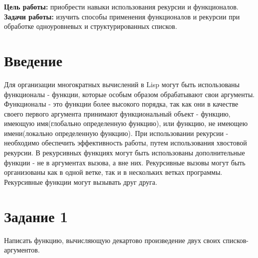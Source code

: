\documentclass[a4paper, 12pt]{article}
\begin{document}
\tableofcontents
\clearpage
\newpage

\textbf{Цель работы:} приобрести навыки использования рекурсии и функционалов.
\\ \hspace*{5mm} \textbf{Задачи работы:} изучить способы применения функционалов и рекурсии при обработке одноуровневых и структурированных списков.


\section*{Введение}

\hspace*{5mm} Для организации многократных вычислений в Lisp могут быть использованы функционалы - функции, которые особым образом обрабатывают свои аргументы. Функционалы - это  функции более высокого порядка, так как они в качестве своего первого аргумента принимают функциональный объект - функцию, имеющую имя(глобально определенную функцию), или функцию, не имеющею имени(локально определенную функцию). При использовании рекурсии - необходимо обеспечить эффективность работы, путем использования хвостовой рекурсии. В рекурсивных функциях могут быть использованы дополнительные функции - не в аргументах вызова, а вне них. Рекурсивные вызовы могут быть организованы как в одной ветке, так и в нескольких ветках программы. Рекурсивные функции могут вызывать друг друга. 
\clearpage
\newpage




\lstset{style=mystyle}

\section*{Задание 1}
Написать функцию, вычисляющую декартово произведение двух своих списков-аргументов.
\end{document}
